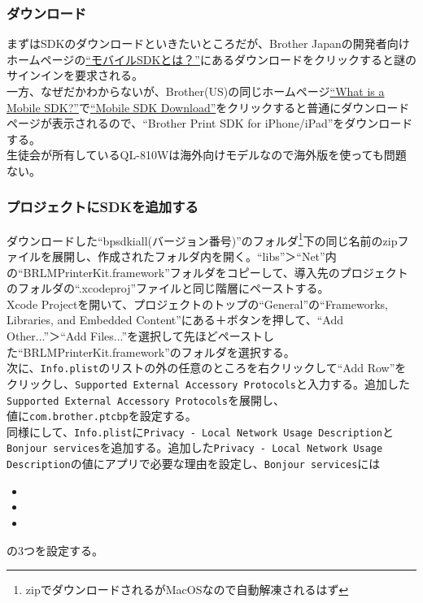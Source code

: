 \documentclass[a4paper]{ltjsreport}
\newcommand{\link}[2]{\href{#2}{#1}}
\begin{document}
\subsubsection{ダウンロード}
まずはSDKのダウンロードといきたいところだが、Brother Japanの開発者向けホームページの\link{``モバイルSDKとは？''}{https://support.brother.co.jp/j/s/es/dev/ja/mobilesdk/index.html?c=jp&lang=ja&navi=offall&comple=on&redirect=on}にあるダウンロードをクリックすると謎のサインインを要求される。 \\
一方、なぜだかわからないが、Brother(US)の同じホームページ\link{``What is a Mobile SDK?''}{https://support.brother.com/g/s/es/dev/en/mobilesdk/index.html?c=eu_ot&lang=en&navi=offall&comple=on&redirect=on}で\link{``Mobile SDK Download''}{https://support.brother.com/g/s/es/dev/en/mobilesdk/download/index.html?c=eu_ot&lang=en&navi=offall&comple=on&redirect=on}をクリックすると普通にダウンロードページが表示されるので、``Brother Print SDK for iPhone/iPad''をダウンロードする。\\
生徒会が所有しているQL-810Wは海外向けモデルなので海外版を使っても問題ない。
\subsubsection{プロジェクトにSDKを追加する}
ダウンロードした``bpsdkiall(バージョン番号)''のフォルダ\footnote{zipでダウンロードされるがMacOSなので自動解凍されるはず}下の同じ名前のzipファイルを展開し、作成されたフォルダ内を開く。``libs''＞``Net''内の``BRLMPrinterKit.framework''フォルダをコピーして、導入先のプロジェクトのフォルダの``.xcodeproj''ファイルと同じ階層にペーストする。\\
Xcode Projectを開いて、プロジェクトのトップの``General''の``Frameworks, Libraries, and Embedded Content''にある＋ボタンを押して、``Add Other...''＞``Add Files...''を選択して先ほどペーストした``BRLMPrinterKit.framework''のフォルダを選択する。\\
次に、\texttt{Info.plist}のリストの外の任意のところを右クリックして``Add Row''をクリックし、\texttt{Supported External Accessory Protocols}と入力する。追加した\texttt{Supported External Accessory Protocols}を展開し、\\値に\texttt{com.brother.ptcbp}を設定する。\\
同様にして、\texttt{Info.plist}に\texttt{Privacy - Local Network Usage Description}と\texttt{Bonjour services}を追加する。追加した\texttt{Privacy - Local Network Usage Description}の値にアプリで必要な理由を設定し、\texttt{Bonjour services}には
\begin{itemize}
  \item {}
  \item {}
  \item {}
\end{itemize}
の3つを設定する。
\end{document}
